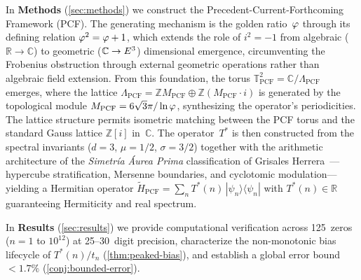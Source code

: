 In \textbf{Methods} (\cref{sec:methods}) we construct the Precedent-Current-Forthcoming Framework (PCF).  The generating mechanism is the golden
ratio~$\varphi$ through its defining relation
$\varphi^2 = \varphi + 1$, which extends the role of $i^2 = -1$ from
algebraic ($\mathbb{R} \to \mathbb{C}$) to geometric
($\mathbb{C} \to E^3$) dimensional emergence, circumventing the
Frobenius obstruction through external geometric operations rather than
algebraic field extension.  From this foundation, the torus
$\mathbb{T}^2_{\mathrm{PCF}} = \mathbb{C}/\Lambda_{\mathrm{PCF}}$
emerges, where the lattice
$\Lambda_{\mathrm{PCF}} = \mathbb{Z} M_{\mathrm{PCF}} \oplus
\mathbb{Z}(M_{\mathrm{PCF}} \cdot i)$ is generated by the topological
module $M_{\mathrm{PCF}} = 6\sqrt{3}\pi/\ln\varphi$, synthesizing the
operator's periodicities.  The lattice structure permits isometric
matching between the PCF torus and the standard Gauss lattice
$\mathbb{Z}[i]$ in~$\mathbb{C}$.  The operator~$T^*$ is then
constructed from the spectral invariants ($d = 3$, $\mu = 1/2$,
$\sigma = 3/2$) together with the arithmetic architecture of the
\emph{Simetría Áurea Prima} classification of Grisales
Herrera~\cite{grisales25}---hypercube stratification, Mersenne
boundaries, and cyclotomic modulation---yielding a Hermitian operator
$\tilde{H}_{\mathrm{PCF}} = \sum_n T^*(n)\,|\psi_n\rangle\langle\psi_n|$
with $T^*(n) \in \mathbb{R}$ guaranteeing Hermiticity and real spectrum.

In \textbf{Results} (\cref{sec:results}) we provide computational
verification across 125~zeros ($n = 1$ to $10^{12}$) at 25--30~digit
precision, characterize the non-monotonic bias lifecycle of $T^*(n)/t_n$
(\cref{thm:peaked-bias}), and establish a global error bound
${<}1.7\%$ (\cref{conj:bounded-error}).

